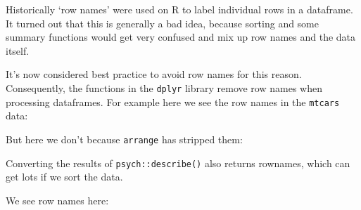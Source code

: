 \documentclass[]{article}
\newenvironment{Shaded}{\begin{snugshade}}{\end{snugshade}}
\newcommand{\KeywordTok}[1]{\textcolor[rgb]{0.13,0.29,0.53}{\textbf{#1}}}
\newcommand{\DecValTok}[1]{\textcolor[rgb]{0.00,0.00,0.81}{#1}}
\newcommand{\StringTok}[1]{\textcolor[rgb]{0.31,0.60,0.02}{#1}}
\newcommand{\OperatorTok}[1]{\textcolor[rgb]{0.81,0.36,0.00}{\textbf{#1}}}
\newcommand{\NormalTok}[1]{#1}
\theoremstyle{definition}
\theoremstyle{definition}
\theoremstyle{definition}
\theoremstyle{remark}
\begin{document}
Historically `row names' were used on R to label individual rows in a
dataframe. It turned out that this is generally a bad idea, because
sorting and some summary functions would get very confused and mix up
row names and the data itself.

It's now considered best practice to avoid row names for this reason.
Consequently, the functions in the \texttt{dplyr} library remove row
names when processing dataframes. For example here we see the row names
in the \texttt{mtcars} data:

\begin{Shaded}
\end{Shaded}

But here we don't because \texttt{arrange} has stripped them:

\begin{Shaded}
\end{Shaded}

Converting the results of \texttt{psych::describe()} also returns
rownames, which can get lots if we sort the data.

We see row names here:
\end{document}
